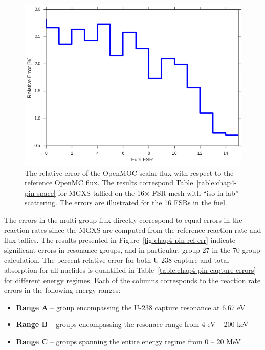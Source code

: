 \begin{figure}[H]
  \centering
  \includegraphics[width=0.8\linewidth]{figures/biases/pin-cell/rel-err-fuel-fsrs}
\caption[Flux relative error by fuel FSR for a 2D fuel pin.]{The relative error of the OpenMOC scalar flux with respect to the reference OpenMC flux. The results correspond Table~\ref{table:chap4-pin-space} for \ac{MGXS} tallied on the 16$\times$ \ac{FSR} mesh with ``iso-in-lab'' scattering. The errors are illustrated for the 16 \ac{FSR}s in the fuel.}
\label{fig:chap4-pin-fuel-fsrs}
\end{figure}

The errors in the multi-group flux directly correspond to equal errors in the reaction rates since the \ac{MGXS} are computed from the reference reaction rate and flux tallies. The results presented in Figure~\ref{fig:chap4-pin-rel-err} indicate significant errors in resonance groups, and in particular, group 27 in the 70-group calculation. The percent relative error for both U-238 capture and total absorption for all nuclides is quantified in Table~\ref{table:chap4-pin-capture-errors} for different energy regimes. Each of the columns corresponds to the reaction rate errors in the following energy ranges:

\vspace{-0.1in}
\begin{itemize}[noitemsep]
  \item {\bf Range A} -- group encompassing the U-238 capture resonance at 6.67 eV
  \item {\bf Range B} -- groups encompassing the resonace range from 4 eV -- 200 keV
  \item {\bf Range C} -- groups spanning the entire energy regime from 0 -- 20 MeV
\end{itemize}
\vspace{-0.1in}

